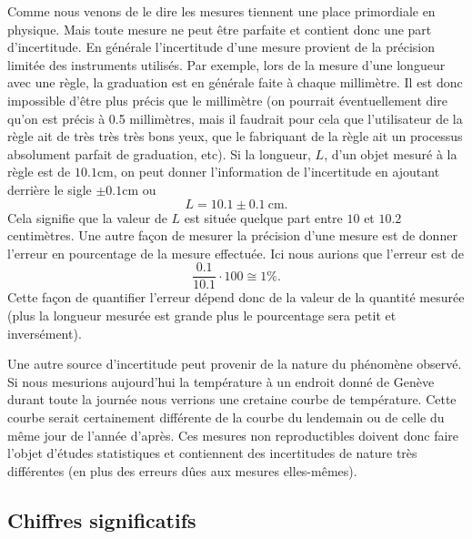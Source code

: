 \documentclass[a4paper,12pt]{book}
\newcommand{\cm}{\mathrm{cm}}
\begin{document}
Comme nous venons de le dire les mesures tiennent une place primordiale en physique. Mais toute mesure ne peut être 
parfaite et contient donc une part d'incertitude. En générale l'incertitude d'une mesure provient 
de la précision limitée des instruments utilisés. Par exemple, lors de la mesure d'une longueur avec une règle,
la graduation est en générale faite à chaque millimètre. Il est donc impossible d'être plus précis
que le millimètre (on pourrait éventuellement dire qu'on est précis à 0.5 millimètres, mais il faudrait pour cela que l'utilisateur de la 
règle ait de très très très bons yeux, que le fabriquant de la règle ait un processus absolument parfait de graduation, etc).
Si la longueur, $L$, d'un objet mesuré à la règle est de $10.1\cm$, on peut donner l'information de l'incertitude 
en ajoutant derrière le sigle $\pm 0.1\cm$ ou
\begin{equation*}
 L=10.1\pm0.1\ \cm.
\end{equation*}
Cela signifie que la valeur de $L$ est située quelque part entre $10$ et $10.2$ centimètres.
Une autre façon de mesurer la précision d'une mesure est de donner l'erreur en pourcentage de la mesure effectuée.
Ici nous aurions que l'erreur est de
\begin{equation*}
 \frac{0.1}{10.1}\cdot 100\cong 1\%.
\end{equation*}
Cette façon de quantifier l'erreur dépend donc de la valeur de la quantité mesurée (plus la longueur mesurée est grande plus
le pourcentage sera petit et inversément).


Une autre source d'incertitude peut provenir de la nature du phénomène observé. Si nous mesurions aujourd'hui la température 
à un endroit donné de Genève durant toute la journée nous verrions une cretaine courbe de température. Cette courbe serait certainement
différente de la courbe du lendemain ou de celle du même jour de l'année d'après. Ces mesures non reproductibles 
doivent donc faire l'objet d'études statistiques et contiennent des incertitudes de nature très différentes (en plus des erreurs dûes aux mesures
elles-mêmes).

\subsection{Chiffres significatifs}
\end{document}

